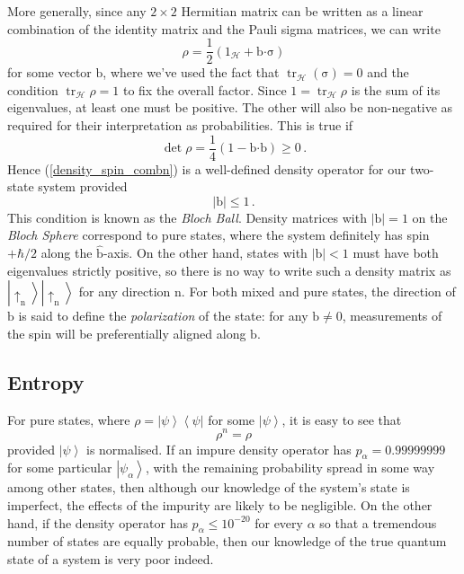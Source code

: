 \documentclass{article}
\theoremstyle{plain}\theoremheaderfont{\normalfont\itshape}\theorembodyfont{\rmfamily}\theoremseparator{.}\newtheorem*{rem}{Remark}\newtheorem*{ex}{Example}\newtheorem*{proof}{Proof}\newtheorem*{altp}{Alternative proof}
\theoremstyle{plain}\theoremheaderfont{\normalfont\bfseries}\theorembodyfont{\rmfamily}\theoremseparator{.}\newtheorem{thm}{Theorem}[section]\newtheorem{lem}[thm]{Lemma}\newtheorem{prop}[thm]{Proposition}\newtheorem*{cor}{Corollary}\newtheorem{defn}[thm]{Definition}\newtheorem{clm}[thm]{Claim}\newtheorem{clminproof}{Claim}
\theoremstyle{break}\theoremheaderfont{\normalfont\itshape}\theorembodyfont{\rmfamily}\theoremseparator{.\medskip}\newtheorem*{proofskip}{Proof}\newtheorem*{exs}{Examples}\newtheorem*{rems}{Remarks}
\theoremstyle{break}\theoremheaderfont{\normalfont\bfseries}\theorembodyfont{\rmfamily}\theoremseparator{.\medskip}\newtheorem{lemskip}[thm]{Lemma}\newtheorem{defnskip}[thm]{Definition}\newtheorem{propskip}[thm]{Proposition}\newtheorem{thmskip}[thm]{Theorem}
\numberwithin{equation}{section}
\newcommand{\bra}[1]{\left\langle #1 \right|}
\newcommand{\ket}[1]{\left| #1 \right\rangle}
\newcommand{\vb}[1]{\bm{\mathrm{#1}}}
\newcommand{\vu}[1]{\hat{\bm{\mathrm{#1}}}}
\newcommand{\vdot}{\bm{\cdot}}
\newcommand{\abs}[1]{\left| #1 \right|}
\newcommand{\hb}{\mathcal{H}}
\DeclareMathOperator{\tr}{tr}
\begin{document}
    More generally, since any \(2\times 2\) Hermitian matrix can be written as a linear combination of the identity matrix and the Pauli sigma matrices, we can write
    \begin{equation}\label{density_spin_combn}
        \rho=\frac{1}{2}(1_\hb+\vb{b}\vdot\vb{\sigma})
    \end{equation}
    for some vector \(\vb{b}\), where we've used the fact that \(\tr_\hb(\vb{\sigma})=0\) and the condition \(\tr_\hb\rho=1\) to fix the overall factor. Since \(1=\tr_\hb\rho\) is the sum of its eigenvalues, at least one must be positive. The other will also be non-negative as required for their interpretation as probabilities. This is true if
    \begin{equation}
        \det\rho=\frac{1}{4}(1-\vb{b}\vdot\vb{b})\ge 0\,.
    \end{equation}
    Hence (\ref{density_spin_combn}) is a well-defined density operator for our two-state system provided
    \begin{equation}
        \abs{\vb{b}}\le 1\,.
    \end{equation}
    This condition is known as the \textit{Bloch Ball}. Density matrices with \(\abs{\vb{b}}=1\) on the \textit{Bloch Sphere} correspond to pure states, where the system definitely has spin \(+\hbar/2\) along the \(\vu{b}\)-axis. On the other hand, states with \(\abs{\vb{b}}<1\) must have both eigenvalues strictly positive, so there is no way to write such a density matrix as \(\ket{\uparrow_{\vb{n}}}\ket{\uparrow_{\vb{n}}}\) for any direction \(\vb{n}\). For both mixed and pure states, the direction of \(\vb{b}\) is said to define the \textit{polarization} of the state: for any \(\vb{b}\ne\vb{0}\), measurements of the spin will be preferentially aligned along \(\vb{b}\).

    \subsection{Entropy}
    For pure states, where \(\rho=\ket{\psi}\bra{\psi}\) for some \(\ket{\psi}\), it is easy to see that
    \begin{equation}
        \rho^n=\rho
    \end{equation}
    provided \(\ket{\psi}\) is normalised. If an impure density operator has \(p_\alpha=0.99999999\) for some particular \(\ket{\psi_\alpha}\), with the remaining probability spread in some way among other states, then although our knowledge of the system's state is imperfect, the effects of the impurity are likely to be negligible. On the other hand, if the density operator has \(p_\alpha\le 10^{-20}\) for every \(\alpha\) so that a tremendous number of states are equally probable, then our knowledge of the true quantum state of a system is very poor indeed.
\end{document}
